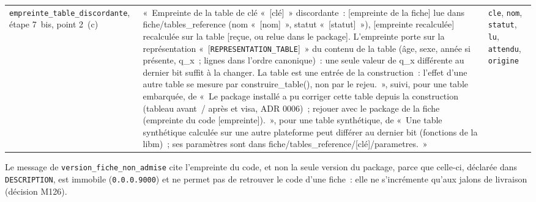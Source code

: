 \documentclass[a4paper,11pt]{article}
\newcommand{\code}[1]{\texttt{\small #1}}
\begin{document}
{\begin{longtable}{@{}p{5.5cm}p{6.7cm}p{2.4cm}@{}}
\code{empreinte\_table\_discordante}, étape 7~bis, point 2~(c) & «~Empreinte de la table de clé «~[clé]~» discordante~: [empreinte de la fiche] lue dans fiche/tables\_reference (nom «~[nom]~», statut «~[statut]~»), [empreinte recalculée] recalculée sur la table [reçue, ou relue dans le package]. L'empreinte porte sur la représentation «~[\code{REPRESENTATION\_TABLE}]~» du contenu de la table (âge, sexe, année si présente, q\_x~; lignes dans l'ordre canonique)~: une seule valeur de q\_x différente au dernier bit suffit à la changer. La table est une entrée de la construction~: l'effet d'une autre table se mesure par construire\_table(), non par le rejeu.~», suivi, pour une table embarquée, de «~Le package installé a pu corriger cette table depuis la construction (tableau avant~/ après et visa, ADR 0006)~; rejouer avec le package de la fiche (empreinte du code [empreinte]).~», pour une table synthétique, de «~Une table synthétique calculée sur une autre plateforme peut différer au dernier bit (fonctions de la libm)~; ses paramètres sont dans fiche/tables\_reference/[clé]/parametres.~» & \code{cle}, \code{nom}, \code{statut}, \code{lu}, \code{attendu}, \code{origine} \\
\end{longtable}
}

\noindent
Le message de \code{version\_fiche\_non\_admise} cite l'empreinte du code,
et non la seule version du package, parce que celle-ci, déclarée dans
\code{DESCRIPTION}, est immobile (\code{0.0.0.9000}) et ne permet pas de
retrouver le code d'une fiche~: elle ne s'incrémente qu'aux jalons de
livraison (décision M126).
\end{document}
